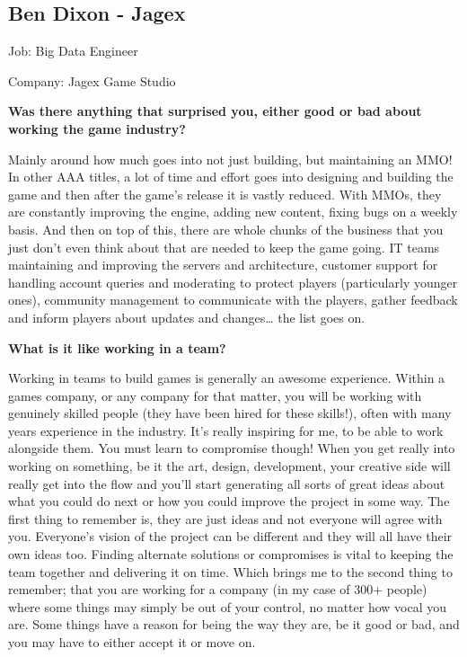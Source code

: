 \documentclass{scrartcl}
\begin{document}
\begin{appendices}
\section{Ben Dixon - Jagex}
Job: Big Data Engineer \par
Company: Jagex Game Studio \par
\textbf{Was there anything that surprised you, either good or bad about working the game industry?} \par
Mainly around how much goes into not just building, but maintaining an MMO! In other AAA titles, a lot of time and effort goes into designing and building the game and then after the game’s release it is vastly reduced. With MMOs, they are constantly improving the engine, adding new content, fixing bugs on a weekly basis.
And then on top of this, there are whole chunks of the business that you just don’t even think about that are needed to keep the game going. IT teams maintaining and improving the servers and architecture, customer support for handling account queries and moderating to protect players (particularly younger ones), community management to communicate with the players, gather feedback and inform players about updates and changes… the list goes on.    
\par
\textbf{What is it like working in a team?}
\par
Working in teams to build games is generally an awesome experience. Within a games company, or any company for that matter, you will be working with genuinely skilled people (they have been hired for these skills!), often with many years experience in the industry. It’s really inspiring for me, to be able to work alongside them.
You must learn to compromise though! When you get really into working on something, be it the art, design, development, your creative side will really get into the flow and you’ll start generating all sorts of great ideas about what you could do next or how you could improve the project in some way. The first thing to remember is, they are just ideas and not everyone will agree with you. Everyone’s vision of the project can be different and they will all have their own ideas too. Finding alternate solutions or compromises is vital to keeping the team together and delivering it on time. Which brings me to the second thing to remember; that you are working for a company (in my case of 300+ people) where some things may simply be out of your control, no matter how vocal you are. Some things have a reason for being the way they are, be it good or bad, and you may have to either accept it or move on.

\end{appendices}
\end{document}
